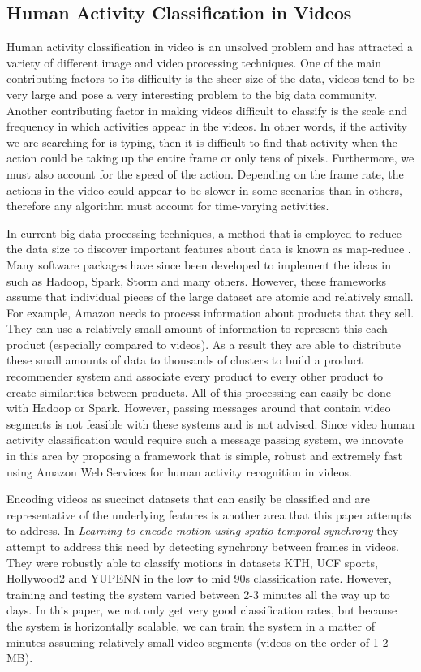 \subsection{\label{subsection:activity_classification}Human Activity Classification in Videos}
Human activity classification in video is an unsolved problem and has attracted
a variety of different image and video processing techniques. One of the main
contributing factors to its difficulty is the sheer size of the data, videos
tend to be very large and pose a very interesting problem to the big data
community. Another contributing factor in making videos difficult to classify is
the scale and frequency in which activities appear in the videos. In other
words, if the activity we are searching for is typing, then it is difficult to
find that activity when the action could be taking up the entire frame or only
tens of pixels. Furthermore, we must also account for the speed of the action.
Depending on the frame rate, the actions in the video could appear to be slower
in some scenarios than in others, therefore any algorithm must account for
time-varying activities.

In current big data processing techniques, a method that is employed to reduce
the data size to discover important features about data is known as map-reduce
\cite{dean2008mapreduce}. Many software packages have since been developed to
implement the ideas in \cite{dean2008mapreduce} such as Hadoop, Spark, Storm
and many others. However, these frameworks assume that individual pieces of the
large dataset are atomic and relatively small. For example, Amazon needs to process
information about products that they sell. They can use a relatively small amount
of information to represent this each product (especially compared to videos).
As a result they are able to distribute these small amounts of data to thousands
of clusters to build a product recommender system and associate every product to
every other product to create similarities between products. All of this processing
can easily be done with Hadoop\cite{White:2009:HDG:1717298} or Spark. However,
passing messages around that contain video segments is not feasible with these
systems and is not advised. Since video human activity classification would
require such a message passing system, we innovate in this area by proposing a
framework that is simple, robust and extremely fast using Amazon Web Services
for human activity recognition in videos.

Encoding videos as succinct datasets that can easily be classified and are
representative of the underlying features is another area that this paper
attempts to address. In \textit{Learning to encode motion using spatio-temporal
synchrony} \cite{konda2013learning} they attempt to address this need by detecting
synchrony between frames in videos. They were robustly able to classify motions in
datasets KTH, UCF sports, Hollywood2 and YUPENN in the low to mid 90s classification
rate. However, training and testing the system varied between 2-3 minutes all
the way up to days. In this paper, we not only get very good classification
rates, but because the system is horizontally scalable, we can train the system
in a matter of minutes assuming relatively small video segments (videos on the
order of 1-2 MB).

